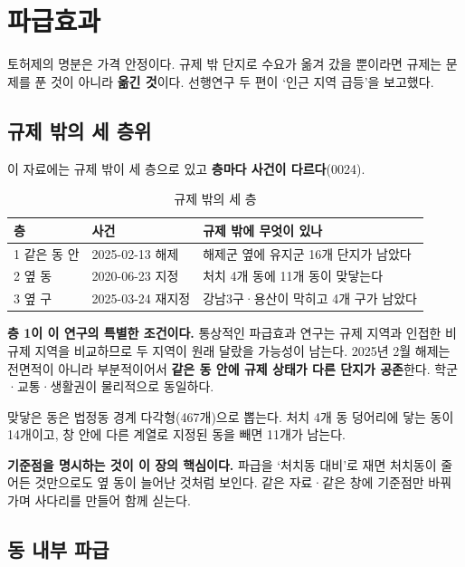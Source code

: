 
\section{파급효과}

토허제의 명분은 가격 안정이다. 규제 밖 단지로 수요가 옮겨 갔을 뿐이라면 규제는
문제를 푼 것이 아니라 \textbf{옮긴 것}이다. 선행연구 두 편이 `인근 지역 급등'을
보고했다\citep{lee2025, yang2025}.

\subsection{규제 밖의 세 층위}

이 자료에는 규제 밖이 세 층으로 있고 \textbf{층마다 사건이 다르다}(0024).

\begin{table}[htbp]
  \centering
  \caption{규제 밖의 세 층}
  \label{tab:spill-layers}
  \begin{tabular}{llp{6.5cm}}
    \toprule
    \textbf{층} & \textbf{사건} & \textbf{규제 밖에 무엇이 있나} \\
    \midrule
    1 같은 동 안 & 2025-02-13 해제 & 해제군 옆에 유지군 16개 단지가 남았다 \\
    2 옆 동 & 2020-06-23 지정 & 처치 4개 동에 11개 동이 맞닿는다 \\
    3 옆 구 & 2025-03-24 재지정 & 강남3구·용산이 막히고 4개 구가 남았다 \\
    \bottomrule
  \end{tabular}
\end{table}

\textbf{층 1이 이 연구의 특별한 조건이다.} 통상적인 파급효과 연구는 규제 지역과
인접한 비규제 지역을 비교하므로 두 지역이 원래 달랐을 가능성이 남는다. 2025년
2월 해제는 전면적이 아니라 부분적이어서 \textbf{같은 동 안에 규제 상태가 다른
단지가 공존}한다. 학군·교통·생활권이 물리적으로 동일하다.

맞닿은 동은 법정동 경계 다각형(467개)으로 뽑는다. 처치 4개 동 덩어리에 닿는 동이
14개이고, 창 안에 다른 계열로 지정된 동을 빼면 11개가 남는다.

\textbf{기준점을 명시하는 것이 이 장의 핵심이다.} 파급을 `처치동 대비'로 재면
처치동이 줄어든 것만으로도 옆 동이 늘어난 것처럼 보인다. 같은 자료·같은 창에
기준점만 바꿔 가며 사다리를 만들어 함께 싣는다.

\subsection{동 내부 파급}


